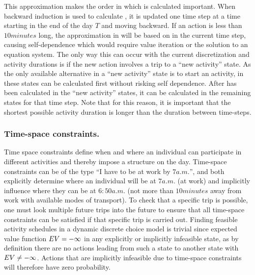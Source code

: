 This approximation makes the order in which \eutil is calculated important. When backward induction is used to calculate \eutil, it is updated one time step at a time starting in the end of the day $T$ and moving backward. If an action is less than $10\unit{minutes}$ long, the approximation in  will be based on \aeutil in the current time step, causing self-dependence which would require value iteration or the solution to an equation system. The only way this can occur with the current discretization and activity durations is if the new action involves a trip to a ``new activity'' state. As the only available alternative in a ``new activity'' state is to start an activity, \aeutil in these states can be calculated first without risking self dependence. After \aeutil has been calculated in the ``new activity'' states, it can be calculated in the remaining states for that time step. Note that for this reason, it is important that the shortest possible activity duration is longer than the duration between time-steps.



\subsubsection{Time-space constraints.} Time space constraints define when and where an individual can participate in different activities and thereby impose a structure on the day. Time-space constraints can be of the type ``I have to be at work by $7\unit{a.m.}$'', and both explicitly determine where an individual will be at $7\unit{a.m.}$ (at work) and implicitly influence where they can be at $6:50\unit{a.m.}$ (not more than $10\unit{minutes}$ away from work with available modes of transport). To check that a specific trip is possible, one must look multiple future trips into the future to ensure that all time-space constraints can be satisfied if that specific trip is carried out. Finding feasible activity schedules in a dynamic discrete choice model is trivial since expected value function $EV = -\infty$ in any explicitly or implicitly infeasible state, as by definition there are no actions leading from such a state to another state with $EV \neq -\infty$. Actions that are implicitly infeasible due to time-space constraints will therefore have zero probability.%

